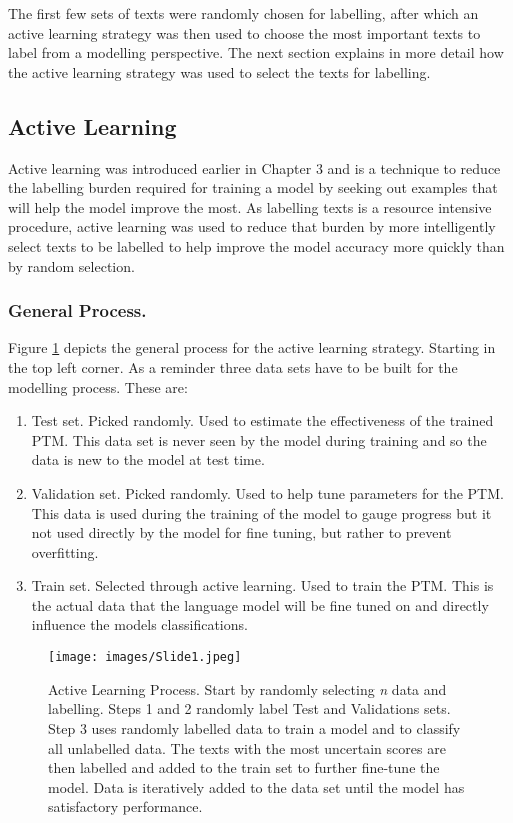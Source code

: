 The first few sets of texts were randomly chosen for labelling, after which an active learning strategy was then used to choose the most important texts to label from a modelling perspective. The next section explains in more detail how the active learning strategy was used to select the texts for labelling.


\subsection{Active Learning}Active learning was introduced earlier in Chapter 3 and is a technique to reduce the labelling burden required for training a model by seeking out examples that will help the model improve the most. As labelling texts is a resource intensive procedure, active learning was used to reduce that burden by more intelligently select texts to be labelled to help improve the model accuracy more quickly than by random selection. 


\subsubsection{General Process.}  

Figure \ref{fig:active_process} depicts the general process for the active learning strategy. Starting in the top left corner. As a reminder three data sets have to be built for the modelling process. These are:

\begin{enumerate}
    \item Test set. Picked randomly. Used to estimate the effectiveness of the trained PTM. This data set is never seen by the model during training and so the data is new to the model at test time.
    \item Validation set. Picked randomly. Used to help tune parameters for the PTM. This data is used during the training of the model to gauge progress but it not used directly by the model for fine tuning, but rather to prevent overfitting.
    \item Train set. Selected through active learning. Used to train the PTM. This is the actual data that the language model will be fine tuned on and directly influence the models classifications.
\end{enumerate}

\begin{figure}[!h]
  \centering
    \texttt{[image: images/Slide1.jpeg]}
    \caption[Active Learning Process.]{Active Learning Process. Start by randomly selecting \emph{n} data and labelling. Steps 1 and 2 randomly label Test and Validations sets. Step 3 uses randomly labelled data to train a model and to classify all unlabelled data. The texts with the most uncertain scores are then labelled and added to the train set to further fine-tune the model. Data is iteratively added to the data set until the model has satisfactory performance.}
    \label{fig:active_process}
\end{figure}

